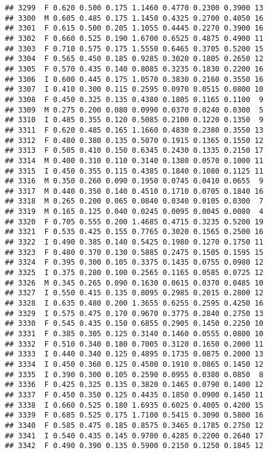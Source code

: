 \documentclass[
]{article}
\begin{document}
\begin{verbatim}
## 3299  F 0.620 0.500 0.175 1.1460 0.4770 0.2300 0.3900 13
## 3300  M 0.605 0.485 0.175 1.1450 0.4325 0.2700 0.4050 16
## 3301  F 0.615 0.500 0.205 1.1055 0.4445 0.2270 0.3900 16
## 3302  F 0.660 0.525 0.190 1.6700 0.6525 0.4875 0.4900 11
## 3303  F 0.710 0.575 0.175 1.5550 0.6465 0.3705 0.5200 15
## 3304  F 0.565 0.450 0.185 0.9285 0.3020 0.1805 0.2650 12
## 3305  F 0.570 0.435 0.140 0.8085 0.3235 0.1830 0.2200 16
## 3306  I 0.600 0.445 0.175 1.0570 0.3830 0.2160 0.3550 16
## 3307  I 0.410 0.300 0.115 0.2595 0.0970 0.0515 0.0800 10
## 3308  F 0.450 0.325 0.135 0.4380 0.1805 0.1165 0.1100  9
## 3309  M 0.275 0.200 0.080 0.0990 0.0370 0.0240 0.0300  5
## 3310  I 0.485 0.355 0.120 0.5085 0.2100 0.1220 0.1350  9
## 3311  F 0.620 0.485 0.165 1.1660 0.4830 0.2380 0.3550 13
## 3312  F 0.480 0.380 0.135 0.5070 0.1915 0.1365 0.1550 12
## 3313  F 0.505 0.410 0.150 0.6345 0.2430 0.1335 0.2150 17
## 3314  M 0.400 0.310 0.110 0.3140 0.1380 0.0570 0.1000 11
## 3315  I 0.450 0.355 0.115 0.4385 0.1840 0.1080 0.1125 11
## 3316  M 0.350 0.260 0.090 0.1950 0.0745 0.0410 0.0655  9
## 3317  M 0.440 0.350 0.140 0.4510 0.1710 0.0705 0.1840 16
## 3318  M 0.265 0.200 0.065 0.0840 0.0340 0.0105 0.0300  7
## 3319  M 0.165 0.125 0.040 0.0245 0.0095 0.0045 0.0080  4
## 3320  F 0.705 0.555 0.200 1.4685 0.4715 0.3235 0.5200 19
## 3321  F 0.535 0.425 0.155 0.7765 0.3020 0.1565 0.2500 16
## 3322  I 0.490 0.385 0.140 0.5425 0.1980 0.1270 0.1750 11
## 3323  F 0.480 0.370 0.130 0.5885 0.2475 0.1505 0.1595 15
## 3324  F 0.395 0.300 0.105 0.3375 0.1435 0.0755 0.0980 12
## 3325  I 0.375 0.280 0.100 0.2565 0.1165 0.0585 0.0725 12
## 3326  M 0.345 0.265 0.090 0.1630 0.0615 0.0370 0.0485 10
## 3327  I 0.550 0.415 0.135 0.8095 0.2985 0.2015 0.2800 12
## 3328  I 0.635 0.480 0.200 1.3655 0.6255 0.2595 0.4250 16
## 3329  I 0.575 0.475 0.170 0.9670 0.3775 0.2840 0.2750 13
## 3330  F 0.545 0.435 0.150 0.6855 0.2905 0.1450 0.2250 10
## 3331  F 0.385 0.305 0.125 0.3140 0.1460 0.0555 0.0800 10
## 3332  F 0.510 0.340 0.180 0.7005 0.3120 0.1650 0.2000 11
## 3333  I 0.440 0.340 0.125 0.4895 0.1735 0.0875 0.2000 13
## 3334  I 0.450 0.360 0.125 0.4500 0.1910 0.0865 0.1450 12
## 3335  I 0.390 0.300 0.105 0.2590 0.0955 0.0380 0.0850  8
## 3336  F 0.425 0.325 0.135 0.3820 0.1465 0.0790 0.1400 12
## 3337  F 0.450 0.350 0.125 0.4435 0.1850 0.0900 0.1450 11
## 3338  I 0.660 0.525 0.180 1.6935 0.6025 0.4005 0.4200 15
## 3339  F 0.685 0.525 0.175 1.7100 0.5415 0.3090 0.5800 16
## 3340  F 0.585 0.475 0.185 0.8575 0.3465 0.1785 0.2750 12
## 3341  I 0.540 0.435 0.145 0.9700 0.4285 0.2200 0.2640 17
## 3342  F 0.490 0.390 0.135 0.5900 0.2150 0.1250 0.1845 12

\end{verbatim}
\end{document}
